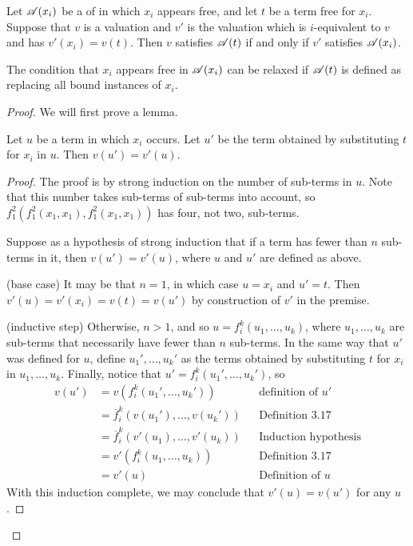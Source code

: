 \setcounter{definition}{22}
\begin{proposition}
  Let \(\mathscr{A}(x_i)\) be a \wf{} of \cl{} in which \(x_i\) appears free, and let \(t\) be a term free for \(x_i\). Suppose that \(v\) is a valuation and \(v'\) is the valuation which is \(i\)-equivalent to \(v\) and has \(v'(x_i) = v(t)\). Then \(v\) satisfies \(\mathscr{A}(t)\) if and only if \(v'\) satisfies \(\mathscr{A}(x_i)\).

  \note{} The condition that \(x_i\) appears free in \(\mathscr{A}(x_i)\) can be relaxed if \(\mathscr{A}(t)\) is defined as replacing all bound instances of \(x_i\).

  \begin{proof}
    We will first prove a lemma.

    \begin{lemma*}
      Let \(u\) be a term in which \(x_i\) occurs. Let \(u'\) be the term obtained by substituting \(t\) for \(x_i\) in \(u\). Then \(v(u') = v'(u)\).

      \begin{proof}
        The proof is by strong induction on the number of sub-terms in \(u\). Note that this number takes sub-terms of sub-terms into account, so \(f^2_1(f^2_1(x_1, x_1), f^2_1(x_1, x_1))\) has four, not two, sub-terms.

        Suppose as a hypothesis of strong induction that if a term has fewer than \(n\) sub-terms in it, then \(v(u') = v'(u)\), where \(u\) and \(u'\) are defined as above.

        (base case) It may be that \(n = 1\), in which case \(u = x_i\) and \(u' = t\). Then \(v'(u) = v'(x_i) = v(t) = v(u')\) by construction of \(v'\) in the premise.

        (inductive step) Otherwise, \(n > 1\), and so \(u = f^k_i(u_1, \dots, u_k)\), where \(u_1, \dots, u_k\) are sub-terms that necessarily have fewer than \(n\) sub-terms. In the same way that \(u'\) was defined for \(u\), define \(u_1', \dots, u_k'\) as the terms obtained by substituting \(t\) for \(x_i\) in \(u_1, \dots, u_k\). Finally, notice that \(u'=f^k_i(u_1', \dots, u_k')\), so
          \begin{align*}
            v(u') &= v(f^k_i(u_1', \dots, u_k'))                      &&\text{definition of \(u'\)}\\
                  &= \overline{f}^k_i(v(u_1'), \dots, v(u_k'))        &&\text{Definition 3.17}\\
                  &= \overline{f}^k_i(v'(u_1), \dots, v'(u_k))        &&\text{Induction hypothesis}\\
                  &= v'(f^k_i(u_1, \dots, u_k))                       &&\text{Definition 3.17}\\
                  &= v'(u)                                            &&\text{Definition of \(u\)}
          \end{align*}
        With this induction complete, we may conclude that \(v'(u) = v(u')\) for any \(u\).
      \end{proof}
    \end{lemma*}


\end{proof}
\end{proposition}
